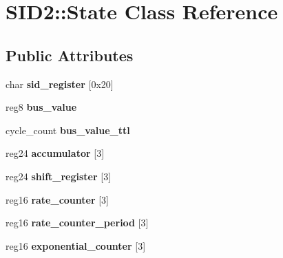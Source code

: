 \hypertarget{classSID2_1_1State}{\section{S\-I\-D2\-:\-:State Class Reference}
\label{classSID2_1_1State}
}
\subsection*{Public Attributes}
\begin{DoxyCompactItemize}
\item 
\hypertarget{classSID2_1_1State_a9d74292782b3c77fef620bb6a516754f}{char {\bfseries sid\-\_\-register} \mbox{[}0x20\mbox{]}}\label{classSID2_1_1State_a9d74292782b3c77fef620bb6a516754f}

\item 
\hypertarget{classSID2_1_1State_a54f17008e06f0004c79c23e0c25eb8d4}{reg8 {\bfseries bus\-\_\-value}}\label{classSID2_1_1State_a54f17008e06f0004c79c23e0c25eb8d4}

\item 
\hypertarget{classSID2_1_1State_a981a0880d1004bd3bcb79166e7d9336d}{cycle\-\_\-count {\bfseries bus\-\_\-value\-\_\-ttl}}\label{classSID2_1_1State_a981a0880d1004bd3bcb79166e7d9336d}

\item 
\hypertarget{classSID2_1_1State_afc82c3b5ad86d681f357919b6324ffcc}{reg24 {\bfseries accumulator} \mbox{[}3\mbox{]}}\label{classSID2_1_1State_afc82c3b5ad86d681f357919b6324ffcc}

\item 
\hypertarget{classSID2_1_1State_a2edbc2cfc8a7e8a6e4cf0c5983dbb0c5}{reg24 {\bfseries shift\-\_\-register} \mbox{[}3\mbox{]}}\label{classSID2_1_1State_a2edbc2cfc8a7e8a6e4cf0c5983dbb0c5}

\item 
\hypertarget{classSID2_1_1State_afd9bdbaf82891f232647ef9e4a08701a}{reg16 {\bfseries rate\-\_\-counter} \mbox{[}3\mbox{]}}\label{classSID2_1_1State_afd9bdbaf82891f232647ef9e4a08701a}

\item 
\hypertarget{classSID2_1_1State_a194d00426ddb6f14c2750610bef3f42e}{reg16 {\bfseries rate\-\_\-counter\-\_\-period} \mbox{[}3\mbox{]}}\label{classSID2_1_1State_a194d00426ddb6f14c2750610bef3f42e}

\item 
\hypertarget{classSID2_1_1State_a306e1a37cc7eaf948fcfa23ca4ee374e}{reg16 {\bfseries exponential\-\_\-counter} \mbox{[}3\mbox{]}}\label{classSID2_1_1State_a306e1a37cc7eaf948fcfa23ca4ee374e}


\end{DoxyCompactItemize}
